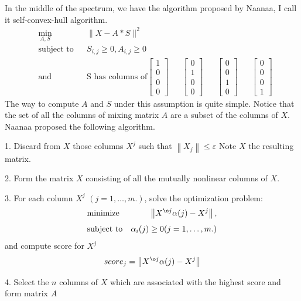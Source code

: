 \documentclass[14pt]{book}
\begin{document}
In the middle of the spectrum, we have the algorithm proposed by Naanaa, I call it self-convex-hull algorithm. 
\begin{equation}
\begin{aligned}
& \underset{A,S}{\text{min}}
& & \parallel X-A*S \parallel ^2   \\
& \text{subject to}
& & S_{i,j}\geq 0,A_{i,j}\geq 0 \\
& \text{and}
& & \text{S has columns of} \begin{bmatrix}
1\\ 
0\\ 
0\\ 
0
\end{bmatrix}
& & \begin{bmatrix}
0\\ 
1\\ 
0\\ 
0
\end{bmatrix}
& & \begin{bmatrix}
0\\ 
0\\ 
1\\ 
0
\end{bmatrix}
& & \begin{bmatrix}
0\\ 
0\\ 
0\\ 
1
\end{bmatrix}
\end{aligned}
\end{equation}
The way to compute $A$ and $S$ under this assumption is quite simple. Notice that the set of all the columns of mixing matrix $A$ are a subset of  the columns of $X$. Naanaa proposed the following algorithm. 

1. Discard from $X$ those columns $X^j$ such that $\left \| X_{j} \right \|\leq \varepsilon$ Note $X$ the resulting matrix. 
\par 2. Form the matrix $X$ consisting of all the mutually nonlinear columns of $X$. 
\par 3. For each column $X^j$ $(j=1, \ldots, m.)$, solve the optimization problem: 
\begin{equation}
\begin{aligned}
& \underset{}{\text{minimize}}
&  \left \| X^{\o j}\alpha(j)-X^j \right \|,   \\
& \text{subject to}
&  \alpha_i(j)\geq 0 (j=1, \ldots, m.)\\
\end{aligned}
\end{equation}
and compute score for $X^j$ 
\begin{equation}
\begin{aligned}
score_j = \left \| X^{\o j}\alpha(j)-X^j \right \|
\end{aligned}
\end{equation}
\par 4. Select the $n$ columns of $X$ which are associated with the highest score and form matrix $A$
\end{document}
